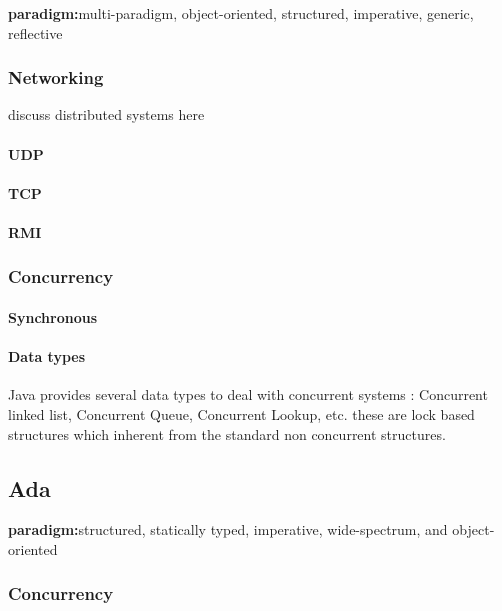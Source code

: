 \documentclass[a4paper,oneside]{report}
\begin{document}
		\textbf{paradigm:}multi-paradigm, object-oriented, structured, imperative, generic, reflective

		\subsubsection{Networking}
			discuss distributed systems here
			\paragraph{UDP}
 

			\paragraph{TCP}

			\paragraph{RMI}


		\subsubsection{Concurrency}

			\paragraph{Synchronous}

			\paragraph{Data types}
				Java provides several data types to deal with concurrent systems : Concurrent linked list, Concurrent Queue, Concurrent Lookup, etc. these are lock based structures which inherent from the standard non concurrent structures. 
			

		\subsubsection{}

	\subsection{Ada}

		\textbf{paradigm:}structured, statically typed, imperative, wide-spectrum, and object-oriented

		\subsubsection{Concurrency}
\end{document}
